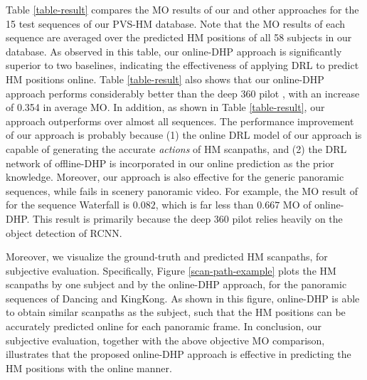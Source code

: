 \documentclass[10pt,journal,compsoc]{IEEEtran}
\begin{document}
Table \ref{table-result} compares the MO results of our and other approaches for the 15 test sequences of our PVS-HM database. Note that the MO results of each sequence are averaged over the predicted HM positions of all 58 subjects in our database. As observed in this table, our online-DHP approach is significantly superior to two baselines, indicating the effectiveness of applying DRL to predict HM positions online.
Table \ref{table-result} also shows that our online-DHP approach performs considerably better than the deep 360 pilot \cite{hu2017deep}, with an increase of 0.354 in average MO.
In addition, as shown in Table \ref{table-result}, our approach outperforms \cite{hu2017deep} over almost all sequences.
The performance improvement of our approach is probably because (1) the online DRL model of our approach is capable of generating the accurate \textit{actions} of HM scanpaths, and (2) the DRL network of offline-DHP is incorporated in our online prediction as the prior knowledge. Moreover, our approach is also effective for the generic panoramic sequences, while \cite{hu2017deep} fails in scenery panoramic video. For example, the MO result of \cite{hu2017deep} for the sequence Waterfall is $0.082$, which is far less than $0.667$ MO of online-DHP. This result is primarily because the deep 360 pilot \cite{hu2017deep} relies heavily on the object detection of RCNN.

Moreover, we visualize the ground-truth and predicted HM scanpaths, for subjective evaluation.
Specifically, Figure \ref{scan-path-example} plots the HM scanpaths by one subject and by the online-DHP approach, for the panoramic sequences of Dancing and KingKong.
As shown in this figure, online-DHP is able to obtain similar scanpaths as the subject, such that the HM positions can be accurately predicted online for each panoramic frame.
In conclusion, our subjective evaluation, together with the above objective MO comparison, illustrates that the proposed online-DHP approach is effective in predicting the HM positions with the online manner.

\end{document}
